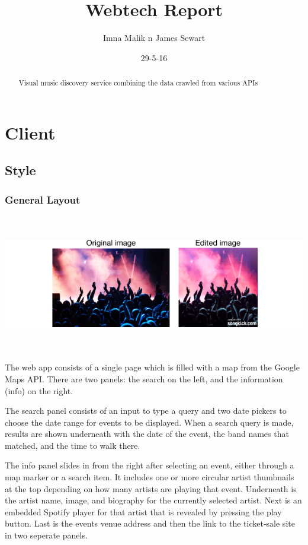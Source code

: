 \documentclass[10pt]{article}
\title{Webtech Report}
\author{Imna Malik n James Sewart}
\date{29-5-16}
\begin{document}
    \maketitle

    \tableofcontents


    \begin{abstract}
        Visual music discovery service combining the data crawled from various APIs
    \end{abstract}

    \section{Client}
        \subsection{Style}
            \subsubsection{General Layout}
                \includegraphics[height=60mm]{example2.png}

                The web app consists of a single page which is filled with a map from the Google Maps API. There are two panels: the search on the left, and the information (info) on the right. 

                The search panel consists of an input to type a query and two date pickers to choose the date range for events to be displayed. When a search query is made, results are shown underneath with the date of the event, the band names that matched, and the time to walk there.

                The info panel slides in from the right after selecting an event, either through a map marker or a search item. It includes one or more circular artist thumbnails at the top depending on how many artists are playing that event. Underneath is the artist name, image, and biography for the currently selected artist. Next is an embedded Spotify player for that artist that is revealed by pressing the play button. Last is the events venue address and then the link to the ticket-sale site in two seperate panels.
\end{document}

